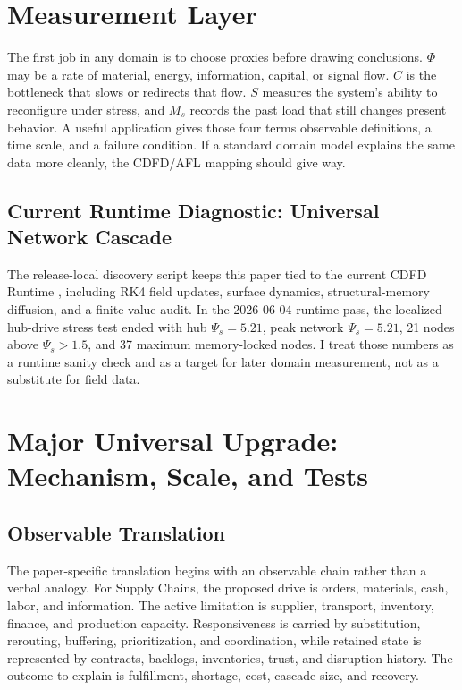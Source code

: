 \documentclass[11pt]{article}
\begin{document}
\section{Measurement Layer}

The first job in any domain is to choose proxies before drawing conclusions. $\Phi$ may be a rate of material, energy, information, capital, or signal flow. $C$ is the bottleneck that slows or redirects that flow. $S$ measures the system's ability to reconfigure under stress, and $M_s$ records the past load that still changes present behavior. A useful application gives those four terms observable definitions, a time scale, and a failure condition. If a standard domain model explains the same data more cleanly, the CDFD/AFL mapping should give way.

\subsection{Current Runtime Diagnostic: Universal Network Cascade}
The release-local discovery script keeps this paper tied to the current CDFD Runtime \cite{CDFDRuntime2026}, including RK4 field updates, surface dynamics, structural-memory diffusion, and a finite-value audit. In the 2026-06-04 runtime pass, the localized hub-drive stress test ended with hub $\Psi_s=5.21$, peak network $\Psi_s=5.21$, 21 nodes above $\Psi_s>1.5$, and 37 maximum memory-locked nodes. I treat those numbers as a runtime sanity check and as a target for later domain measurement, not as a substitute for field data.


\section{Major Universal Upgrade: Mechanism, Scale, and Tests}

\subsection{Observable Translation}

The paper-specific translation begins with an observable chain rather than a
verbal analogy. For Supply Chains, the proposed drive is orders, materials, cash, labor, and information.
The active limitation is supplier, transport, inventory, finance, and production capacity. Responsiveness is carried by
substitution, rerouting, buffering, prioritization, and coordination, while retained state is represented by
contracts, backlogs, inventories, trust, and disruption history. The outcome to explain is fulfillment, shortage, cost, cascade size, and recovery.
\end{document}

